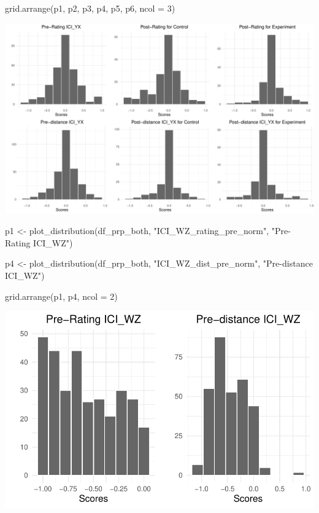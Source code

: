 \documentclass[
  letterpaper,
  DIV=11,
  numbers=noendperiod]{scrartcl}
\newenvironment{Shaded}{\begin{snugshade}}{\end{snugshade}}
\newcommand{\AttributeTok}[1]{\textcolor[rgb]{0.40,0.45,0.13}{#1}}
\newcommand{\DecValTok}[1]{\textcolor[rgb]{0.68,0.00,0.00}{#1}}
\newcommand{\FunctionTok}[1]{\textcolor[rgb]{0.28,0.35,0.67}{#1}}
\newcommand{\NormalTok}[1]{\textcolor[rgb]{0.00,0.23,0.31}{#1}}
\newcommand{\OtherTok}[1]{\textcolor[rgb]{0.00,0.23,0.31}{#1}}
\newcommand{\StringTok}[1]{\textcolor[rgb]{0.13,0.47,0.30}{#1}}
\begin{document}
\begin{Shaded}
\begin{Highlighting}[]
\FunctionTok{grid.arrange}\NormalTok{(p1, p2, p3, p4, p5, p6, }\AttributeTok{ncol =} \DecValTok{3}\NormalTok{)}
\end{Highlighting}
\end{Shaded}

\includegraphics{index_files/figure-pdf/unnamed-chunk-19-1.pdf}

\begin{Shaded}
\begin{Highlighting}[]
\NormalTok{p1 }\OtherTok{\textless{}{-}} \FunctionTok{plot\_distribution}\NormalTok{(df\_prp\_both, }\StringTok{"ICI\_WZ\_rating\_pre\_norm"}\NormalTok{, }\StringTok{"Pre{-}Rating ICI\_WZ"}\NormalTok{)}

\NormalTok{p4 }\OtherTok{\textless{}{-}} \FunctionTok{plot\_distribution}\NormalTok{(df\_prp\_both, }\StringTok{"ICI\_WZ\_dist\_pre\_norm"}\NormalTok{, }\StringTok{"Pre{-}distance ICI\_WZ"}\NormalTok{)}

\FunctionTok{grid.arrange}\NormalTok{(p1, p4, }\AttributeTok{ncol =} \DecValTok{2}\NormalTok{)}
\end{Highlighting}
\end{Shaded}

\includegraphics{index_files/figure-pdf/unnamed-chunk-20-1.pdf}
\end{document}
